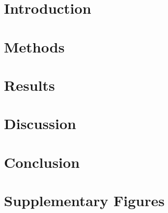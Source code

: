 \documentclass[12pt, oneside]{smuthesis}
\begin{document}

\mainmatter
\chapter{Introduction}

\newpage

\chapter{Methods}

\newpage


\chapter{Results}

\newpage

\chapter{Discussion}

\newpage

\chapter{Conclusion}

\newpage

\appendix
\chapter{Supplementary Figures}

\newpage


\begin{singlespace}
    
\end{singlespace}
\end{document}
